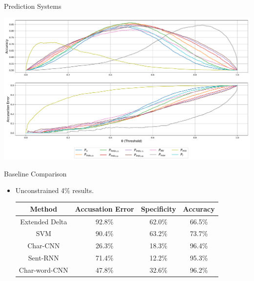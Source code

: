 \documentclass[10pt]{beamer}
\begin{document}
\begin{frame}[fragile]{Prediction Systems}
    \begin{center}
        \includegraphics[width=\textwidth]{../../report/pictures/experiments/conv_char_nn/prediction_system_50}
    \end{center}
\end{frame}

\begin{frame}[fragile]{Baseline Comparison}
    \begin{itemize}
        \item Unconstrained 4\% results.
            \begin{center}
                \begin{tabular}{c|ccc}
                    \textbf{Method}      & \textbf{Accusation Error} &
                    \textbf{Specificity} & \textbf{Accuracy}
                    \\ \hline
                    Extended Delta       & 92.8\%                    &
                    62.0\%               & 66.5\%
                    \\
                    SVM                  & 90.4\%                    &
                    63.2\%               & 73.7\%
                    \\
                    Char-CNN             & 26.3\%                    &
                    18.3\%               & 96.4\%
                    \\
                    Sent-RNN             & 71.4\%                    &
                    12.2\%               & 95.3\%
                    \\
                    Char-word-CNN        & 47.8\%                    &
                    32.6\%               & 96.2\%
                \end{tabular}
            \end{center}
    \end{itemize}
\end{frame}
\end{document}
